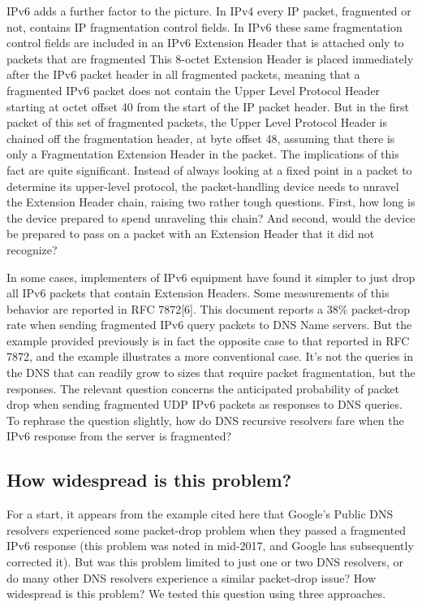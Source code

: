 IPv6 adds a further factor to the picture. In IPv4 every IP packet, fragmented
or not, contains IP fragmentation control fields. In IPv6 these
same fragmentation control fields are included in an IPv6 Extension
Header that is attached only to packets that are fragmented This 8-octet 
Extension Header is placed immediately after the IPv6
packet header in all fragmented packets, meaning that a fragmented
IPv6 packet does not contain the Upper Level Protocol Header starting
at octet offset 40 from the start of the IP packet header. But in
the first packet of this set of fragmented packets, the Upper Level
Protocol Header is chained off the fragmentation header, at byte offset
48, assuming that there is only a Fragmentation Extension Header
in the packet. The implications of this fact are quite significant.
Instead of always looking at a fixed point in a packet to determine its
upper-level protocol, the packet-handling device needs to unravel the
Extension Header chain, raising two rather tough questions. First,
how long is the device prepared to spend unraveling this chain? And
second, would the device be prepared to pass on a packet with an
Extension Header that it did not recognize?

In some cases, implementers of IPv6 equipment have found it simpler
to just drop all IPv6 packets that contain Extension Headers. Some
measurements of this behavior are reported in RFC 7872[6]. This
document reports a 38\% packet-drop rate when sending fragmented
IPv6 query packets to DNS Name servers. But the example provided
previously is in fact the opposite case to that reported in RFC 7872,
and the example illustrates a more conventional case. It’s not the
queries in the DNS that can readily grow to sizes that require packet
fragmentation, but the responses. The relevant question concerns
the anticipated probability of packet drop when sending fragmented
UDP IPv6 packets as responses to DNS queries. To rephrase the question
slightly, how do DNS recursive resolvers fare when the IPv6
response from the server is fragmented?

\subsection{How widespread is this problem?}

For a start, it appears from the example cited here that Google’s
Public DNS resolvers experienced some packet-drop problem when
they passed a fragmented IPv6 response (this problem was noted in
mid-2017, and Google has subsequently corrected it). But was this
problem limited to just one or two DNS resolvers, or do many other
DNS resolvers experience a similar packet-drop issue? How widespread
is this problem? We tested this question using three approaches.
